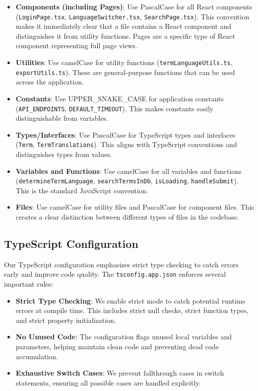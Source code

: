 \documentclass[12pt]{article}
\begin{document}
\begin{itemize}
    \item \textbf{Components (including Pages)}: Use PascalCase for all React components (\texttt{LoginPage.tsx}, \texttt{LanguageSwitcher.tsx}, \texttt{SearchPage.tsx}). This convention makes it immediately clear that a file contains a React component and distinguishes it from utility functions. Pages are a specific type of React component representing full page views.
    
    \item \textbf{Utilities}: Use camelCase for utility functions (\texttt{termLanguageUtils.ts}, \texttt{exportUtils.ts}). These are general-purpose functions that can be used across the application.
    
    \item \textbf{Constants}: Use UPPER\_SNAKE\_CASE for application constants (\texttt{API\_ENDPOINTS}, \texttt{DEFAULT\_TIMEOUT}). This makes constants easily distinguishable from variables.
    
    \item \textbf{Types/Interfaces}: Use PascalCase for TypeScript types and interfaces (\texttt{Term}, \texttt{TermTranslations}). This aligns with TypeScript conventions and distinguishes types from values.
    
    \item \textbf{Variables and Functions}: Use camelCase for all variables and functions (\texttt{determineTermLanguage}, \texttt{searchTermsInDb}, \texttt{isLoading}, \texttt{handleSubmit}). This is the standard JavaScript convention.
    
    \item \textbf{Files}: Use camelCase for utility files and PascalCase for component files. This creates a clear distinction between different types of files in the codebase.
\end{itemize}

\subsection{TypeScript Configuration}
Our TypeScript configuration emphasizes strict type checking to catch errors early and improve code quality. The \texttt{tsconfig.app.json} enforces several important rules:

\begin{itemize}
    \item \textbf{Strict Type Checking}: We enable strict mode to catch potential runtime errors at compile time. This includes strict null checks, strict function types, and strict property initialization.
    
    \item \textbf{No Unused Code}: The configuration flags unused local variables and parameters, helping maintain clean code and preventing dead code accumulation.
    
    \item \textbf{Exhaustive Switch Cases}: We prevent fallthrough cases in switch statements, ensuring all possible cases are handled explicitly.
\end{itemize}
\end{document}
